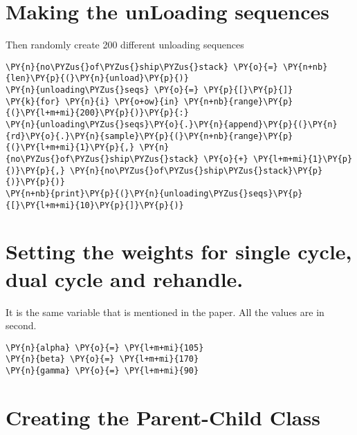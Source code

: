 \section*{Making the unLoading
sequences}\label{making-the-unloading-sequences}

Then randomly create 200 different unloading sequences

\begin{tcolorbox}[breakable, size=fbox, boxrule=1pt, pad at break*=1mm,colback=cellbackground, colframe=cellborder]
\begin{Verbatim}[commandchars=\\\{\}]
\PY{n}{no\PYZus{}of\PYZus{}ship\PYZus{}stack} \PY{o}{=} \PY{n+nb}{len}\PY{p}{(}\PY{n}{unload}\PY{p}{)}
\PY{n}{unloading\PYZus{}seqs} \PY{o}{=} \PY{p}{[}\PY{p}{]}
\PY{k}{for} \PY{n}{i} \PY{o+ow}{in} \PY{n+nb}{range}\PY{p}{(}\PY{l+m+mi}{200}\PY{p}{)}\PY{p}{:}
\PY{n}{unloading\PYZus{}seqs}\PY{o}{.}\PY{n}{append}\PY{p}{(}\PY{n}{rd}\PY{o}{.}\PY{n}{sample}\PY{p}{(}\PY{n+nb}{range}\PY{p}{(}\PY{l+m+mi}{1}\PY{p}{,} \PY{n}{no\PYZus{}of\PYZus{}ship\PYZus{}stack} \PY{o}{+} \PY{l+m+mi}{1}\PY{p}{)}\PY{p}{,} \PY{n}{no\PYZus{}of\PYZus{}ship\PYZus{}stack}\PY{p}{)}\PY{p}{)}
\PY{n+nb}{print}\PY{p}{(}\PY{n}{unloading\PYZus{}seqs}\PY{p}{[}\PY{l+m+mi}{10}\PY{p}{]}\PY{p}{)}
\end{Verbatim}
\end{tcolorbox}

\section*{Setting the weights for single cycle, dual cycle and
rehandle.}\label{setting-the-weights-for-single-cycle-dual-cycle-and-rehandle.}

It is the same variable that is mentioned in the paper. All the values
are in second.

\begin{tcolorbox}[breakable, size=fbox, boxrule=1pt, pad at break*=1mm,colback=cellbackground, colframe=cellborder]
\begin{Verbatim}[commandchars=\\\{\}]
\PY{n}{alpha} \PY{o}{=} \PY{l+m+mi}{105}
\PY{n}{beta} \PY{o}{=} \PY{l+m+mi}{170}
\PY{n}{gamma} \PY{o}{=} \PY{l+m+mi}{90}
\end{Verbatim}
\end{tcolorbox}

\section*{Creating the Parent-Child
Class}\label{creating-the-parent-child-class}

